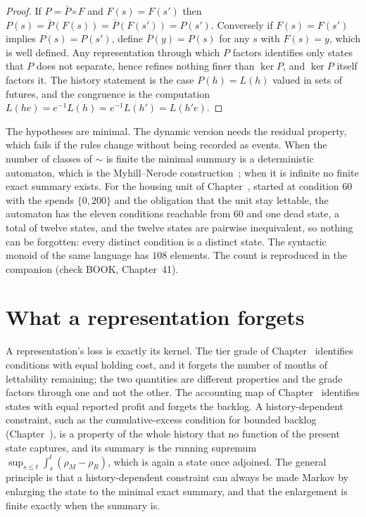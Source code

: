 \begin{proof}
If $P=\bar P\circ F$ and $F(s)=F(s')$ then $P(s)=\bar P(F(s))=\bar P(F(s'))=P(s')$. Conversely if $F(s)=F(s')$ implies $P(s)=P(s')$, define $\bar P(y)=P(s)$ for any $s$ with $F(s)=y$, which is well defined. Any representation through which $P$ factors identifies only states that $P$ does not separate, hence refines nothing finer than $\ker P$, and $\ker P$ itself factors it. The history statement is the case $P(h)=L(h)$ valued in sets of futures, and the congruence is the computation $L(he)=e^{-1}L(h)=e^{-1}L(h')=L(h'e)$.
\end{proof}

The hypotheses are minimal. The dynamic version needs the residual property, which fails if the rules change without being recorded as events. When the number of classes of $\sim$ is finite the minimal summary is a deterministic automaton, which is the Myhill--Nerode construction~\cite{nerode1958}; when it is infinite no finite exact summary exists. For the housing unit of Chapter~, started at condition $60$ with the spends $\{0,200\}$ and the obligation that the unit stay lettable, the automaton has the eleven conditions reachable from $60$ and one dead state, a total of twelve states, and the twelve states are pairwise inequivalent, so nothing can be forgotten: every distinct condition is a distinct state. The syntactic monoid of the same language has $108$ elements. The count is reproduced in the companion (check BOOK, Chapter~41).

\section{What a representation forgets}

A representation's loss is exactly its kernel. The tier grade of Chapter~ identifies conditions with equal holding cost, and it forgets the number of months of lettability remaining; the two quantities are different properties and the grade factors through one and not the other. The accounting map of Chapter~ identifies states with equal reported profit and forgets the backlog. A history-dependent constraint, such as the cumulative-excess condition for bounded backlog (Chapter~), is a property of the whole history that no function of the present state captures, and its summary is the running supremum $\sup_{s\le t}\int_s^t(\rho_M-\rho_R)$, which is again a state once adjoined. The general principle is that a history-dependent constraint can always be made Markov by enlarging the state to the minimal exact summary, and that the enlargement is finite exactly when the summary is.

